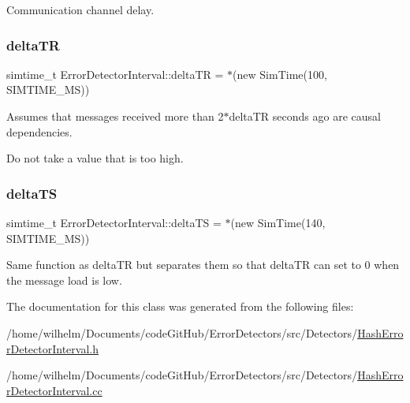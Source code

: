 Communication channel delay. 

\mbox{\label{class_error_detector_interval_a24f229a469ae7c4314a948015cddb277}} 
\subsubsection{\texorpdfstring{delta\+TR}{deltaTR}}
{\footnotesize\ttfamily simtime\+\_\+t Error\+Detector\+Interval\+::delta\+TR = $\ast$(new Sim\+Time(100, S\+I\+M\+T\+I\+M\+E\+\_\+\+MS))\hspace{0.3cm}{\ttfamily [private]}}



Assumes that messages received more than 2$\ast$delta\+TR seconds ago are causal dependencies. 

Do not take a value that is too high. \mbox{\label{class_error_detector_interval_a2368ba76496cfd25487e150a961bb08b}} 
\subsubsection{\texorpdfstring{delta\+TS}{deltaTS}}
{\footnotesize\ttfamily simtime\+\_\+t Error\+Detector\+Interval\+::delta\+TS = $\ast$(new Sim\+Time(140, S\+I\+M\+T\+I\+M\+E\+\_\+\+MS))\hspace{0.3cm}{\ttfamily [private]}}



Same function as delta\+TR but separates them so that delta\+TR can set to 0 when the message load is low. 



The documentation for this class was generated from the following files\+:\begin{DoxyCompactItemize}
\item 
/home/wilhelm/\+Documents/code\+Git\+Hub/\+Error\+Detectors/src/\+Detectors/\hyperlink{_hash_error_detector_interval_8h}{Hash\+Error\+Detector\+Interval.\+h}\item 
/home/wilhelm/\+Documents/code\+Git\+Hub/\+Error\+Detectors/src/\+Detectors/\hyperlink{_hash_error_detector_interval_8cc}{Hash\+Error\+Detector\+Interval.\+cc}\end{DoxyCompactItemize}
